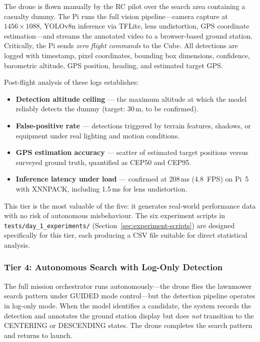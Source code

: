 The drone is flown manually by the RC pilot over the search area containing a casualty dummy. The Pi runs the full vision pipeline---camera capture at $1456 \times 1088$, YOLOv8n inference via TFLite, lens undistortion, GPS coordinate estimation---and streams the annotated video to a browser-based ground station. Critically, the Pi sends \emph{zero flight commands} to the Cube. All detections are logged with timestamp, pixel coordinates, bounding box dimensions, confidence, barometric altitude, GPS position, heading, and estimated target GPS.

Post-flight analysis of these logs establishes:
\begin{itemize}
    \item \textbf{Detection altitude ceiling} --- the maximum altitude at which the model reliably detects the dummy (target: 30\,m, to be confirmed).
    \item \textbf{False-positive rate} --- detections triggered by terrain features, shadows, or equipment under real lighting and motion conditions.
    \item \textbf{GPS estimation accuracy} --- scatter of estimated target positions versus surveyed ground truth, quantified as CEP50 and CEP95.
    \item \textbf{Inference latency under load} --- confirmed at 208\,ms (4.8~FPS) on Pi~5 with XNNPACK, including 1.5\,ms for lens undistortion.
\end{itemize}

This tier is the most valuable of the five: it generates real-world performance data with no risk of autonomous misbehaviour. The six experiment scripts in \texttt{tests/day\_1\_experiments/} (Section~\ref{sec:experiment-scripts}) are designed specifically for this tier, each producing a CSV file suitable for direct statistical analysis.

\subsubsection{Tier 4: Autonomous Search with Log-Only Detection}

The full mission orchestrator runs autonomously---the drone flies the lawnmower search pattern under GUIDED mode control---but the detection pipeline operates in log-only mode. When the model identifies a candidate, the system records the detection and annotates the ground station display but does \emph{not} transition to the CENTERING or DESCENDING states. The drone completes the search pattern and returns to launch.

